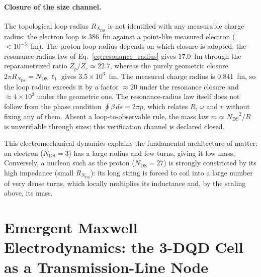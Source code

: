 \documentclass[11pt,a4paper]{article}
\theoremstyle{plain}
\theoremstyle{remark}
\newcommand{\Ncd}{\ensuremath{N_{\mathrm{DS}}}}
\begin{document}
\paragraph{Closure of the size channel.} The topological loop radius $R_{\Ncd}$ is not identified with any measurable charge radius: the electron loop is 386~fm against a point-like measured electron ($<10^{-3}$~fm). The proton loop radius depends on which closure is adopted: the resonance-radius law of Eq.~\eqref{eq:resonance_radius} gives $17.0$~fm through the reparametrized ratio $Z_p/Z_e \simeq 22.7$, whereas the purely geometric closure $2\pi R_{\Ncd} = \Ncd\,\ell_1$ gives $3.5\times10^{3}$~fm. The measured charge radius is $0.841$~fm, so the loop radius exceeds it by a factor $\approx 20$ under the resonance closure and $\approx 4\times10^{3}$ under the geometric one. The resonance-radius law itself does not follow from the phase condition \mbox{$\oint\beta\,ds = 2\pi p$}, which relates $R$, $\omega$ and $v$ without fixing any of them. Absent a loop-to-observable rule, the mass law $m \propto \Ncd^2/R$ is unverifiable through sizes; this verification channel is declared closed.

This electromechanical dynamics explains the fundamental architecture of matter: an electron ($\Ncd=3$) has a large radius and few turns, giving it low mass. Conversely, a nucleon such as the proton ($\Ncd=27$) is strongly constricted by its high impedance (small $R_{\Ncd}$): its long string is forced to coil into a large number of very dense turns, which locally multiplies its inductance and, by the scaling above, its mass.

\section{Emergent Maxwell Electrodynamics: the 3-DQD Cell as a Transmission-Line Node}
\label{sec:maxwell3d}
\end{document}
